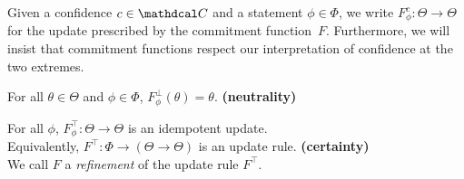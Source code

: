 \documentclass{article}
\def\cofunc{commitment function}
\def\confdom{\mathdcal C}
\begin{document}
Given a confidence $c \in \confdom$ and a statement $\phi \in \Phi$, we write
$F^c_\phi : \Theta \to \Theta$
for the update prescribed by the \cofunc\ $F$.
Furthermore, we will insist that \cofunc s respect our interpretation of confidence at the two extremes.
\begin{CFaxioms}
	\item 
		For all $\theta \in \Theta$ and $\phi \in \Phi$, $F^{\bot}_\phi(\theta) = \theta$.
		\hfill \textbf{(neutrality)} \label{ax:zero}
	\item
		For all $\phi$,
		$F^\top_\phi : \Theta \to \Theta$
		is an idempotent update.\\
		Equivalently, $F^\top: \Phi \to (\Theta \to \Theta)$ is an update rule.
		\hfill \textbf{(certainty)} \label{ax:idemp}\\
		We call $F$ a \emph{refinement} of the update rule $F^\top$.
\end{CFaxioms}
\end{document}
